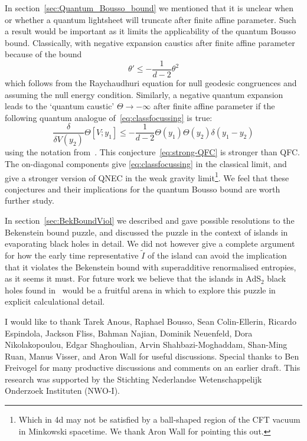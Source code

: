 \documentclass[a4paper,11pt]{article}
\def\bne{\begin{equation}}
\def\ene{\end{equation}}
\begin{document}
In section~\ref{sec:Quantum_Bousso_bound} we mentioned that it is unclear when or whether a quantum lightsheet will truncate after finite affine parameter. Such a result would be important as it limits the applicability of the quantum Bousso bound. Classically,  with negative expansion  caustics after finite affine parameter because of the bound
\bne \label{eq:classfocussing} \theta' \leq -\frac{1}{d-2}\theta^2 \ene
which follows from the Raychaudhuri equation for null geodesic congruences and assuming the null energy condition. Similarly, a negative quantum expansion leads to the `quantum caustic' $\Theta \to -\infty$ after finite affine parameter if the following quantum analogue of~\eqref{eq:classfocussing} is true:
\bne \label{eq:strong-QFC} \frac{\delta}{\delta V(y_2)} \Theta[V;y_1]\leq -\frac{1}{d-2} \Theta (y_1) \Theta (y_2) \delta (y_1 - y_2) \ene
using the notation from~\cite{Bousso2015}.  This conjecture~\eqref{eq:strong-QFC} is stronger than QFC. The on-diagonal components give \eqref{eq:classfocussing} in the classical limit, and give a stronger version of QNEC in the weak gravity limit\footnote{Which in 4d may not be satisfied by a ball-shaped region of the CFT vacuum in Minkowski spacetime. We thank Aron Wall for pointing this out.}. We feel that these conjectures and their implications for the quantum Bousso bound are worth further study.

In section~\ref{sec:BekBoundViol} we described and gave possible resolutions to the Bekenstein bound puzzle, and discussed the puzzle in the context of islands in evaporating black holes in detail. We did not however give a complete argument for how the early time representative $\tilde I$ of the island can avoid the implication that it violates the Bekenstein bound with superadditive renormalised entropies, as it seems it must. For future work we believe that the islands in AdS$_2$ black holes found in~\cite{Almheiri2019} would be a fruitful arena in which to explore this puzzle in explicit calculational detail.





\acknowledgments

I would like to thank Tarek Anous, Raphael Bousso, Sean Colin-Ellerin, Ricardo Espindola, Jackson Fliss, Bahman Najian, Dominik Neuenfeld, Dora Nikolakopoulou, Edgar Shaghoulian, Arvin Shahbazi-Moghaddam, Shan-Ming Ruan, Manus Visser, and Aron Wall for useful discussions. Special thanks to Ben Freivogel for many productive discussions and comments on an earlier draft. This research was supported by the Stichting Nederlandse Wetenschappelijk Onderzoek Instituten (NWO-I). 
%
\appendix
%
\end{document}
